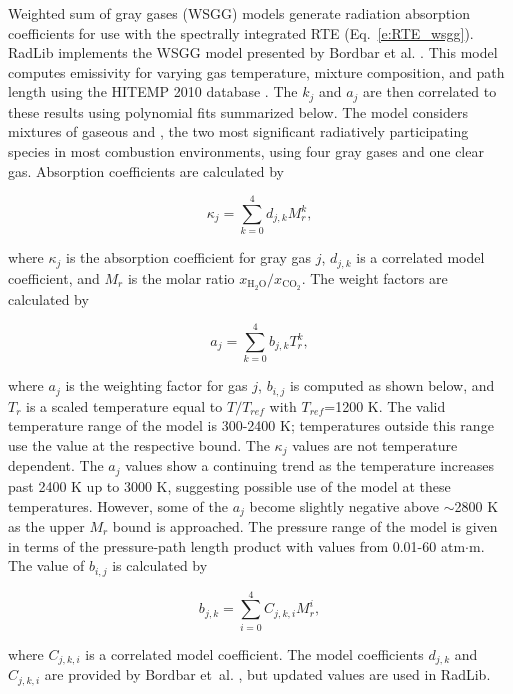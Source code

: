 \documentclass[preprint,12pt]{elsarticle}
\begin{document}
Weighted sum of gray gases (WSGG) models generate radiation absorption coefficients for use with the spectrally integrated RTE (Eq.~\ref{e:RTE_wsgg}).
RadLib implements the WSGG model presented by Bordbar et al. \citep{Bordbar_2014,Bordbar_2020}. This model computes emissivity for varying gas temperature, mixture composition, and path length using the HITEMP 2010 database \cite{Rothman_2010}. The $k_j$ and $a_j$ are then correlated to these results using polynomial fits summarized below. The model considers mixtures of gaseous  and , the two most significant radiatively participating species in most combustion environments, using four gray gases and one clear gas. Absorption coefficients are calculated by
%
\begin{linenomath}
\begin{equation}
    \kappa_j=\sum_{k=0}^{4}d_{j,k}M_r^k,
\end{equation}
\end{linenomath}
%
where $\kappa_j$ is the absorption coefficient for gray gas $j$, $d_{j,k}$ is a correlated model coefficient, and $M_r$ is the molar ratio $x_{\mathrm{H_2O}}/x_{\mathrm{CO_2}}$. The weight factors are calculated by
%
\begin{linenomath}
\begin{equation}
    a_j=\sum_{k=0}^{4}b_{j,k}T_r^k,
\end{equation}
\end{linenomath}
%
where $a_j$ is the weighting factor for gas $j$, $b_{i,j}$ is computed as shown below,  and $T_r$ is a scaled temperature equal to $T/T_{ref}$ with $T_{ref}$=1200 K. The valid temperature range of the model is 300-2400 K; temperatures outside this range use the value at the respective bound. The $\kappa_j$ values are not temperature dependent. The $a_j$ values show a continuing trend as the temperature increases past 2400 K up to 3000 K, suggesting possible use of the model at these temperatures. However, some of the $a_j$ become slightly negative above $\sim$2800 K as the upper $M_r$ bound is approached. The pressure range of the model is given in terms of the pressure-path length product with values from 0.01-60 atm$\cdot$m. The value of $b_{i,j}$ is calculated by
%
\begin{linenomath}
\begin{equation}
    b_{j,k}=\sum_{i=0}^{4}C_{j,k,i}M_r^i,
\end{equation}
\end{linenomath}
%
where $C_{j,k,i}$ is a correlated model coefficient. The model coefficients $d_{j,k}$ and $C_{j,k,i}$ are provided by Bordbar et~al. \citep{Bordbar_2014,Bordbar_2020}, but updated values are used in RadLib.
\end{document}
